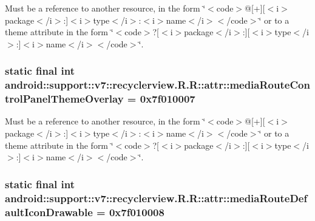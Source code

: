 Must be a reference to another resource, in the form \char`\"{}$<$code$>$@\mbox{[}+\mbox{]}\mbox{[}$<$i$>$package$<$/i$>$:\mbox{]}$<$i$>$type$<$/i$>$:$<$i$>$name$<$/i$>$$<$/code$>$\char`\"{} or to a theme attribute in the form \char`\"{}$<$code$>$?\mbox{[}$<$i$>$package$<$/i$>$:\mbox{]}\mbox{[}$<$i$>$type$<$/i$>$:\mbox{]}$<$i$>$name$<$/i$>$$<$/code$>$\char`\"{}. \hypertarget{classandroid_1_1support_1_1v7_1_1recyclerview_1_1_r_1_1attr_3626ffbedd7ef5a8436826ccac0b8109}{
\subsubsection[{mediaRouteControlPanelThemeOverlay}]{\setlength{\rightskip}{0pt plus 5cm}static final int android::support::v7::recyclerview.R.R::attr::mediaRouteControlPanelThemeOverlay = 0x7f010007}}
\label{classandroid_1_1support_1_1v7_1_1recyclerview_1_1_r_1_1attr_3626ffbedd7ef5a8436826ccac0b8109}


Must be a reference to another resource, in the form \char`\"{}$<$code$>$@\mbox{[}+\mbox{]}\mbox{[}$<$i$>$package$<$/i$>$:\mbox{]}$<$i$>$type$<$/i$>$:$<$i$>$name$<$/i$>$$<$/code$>$\char`\"{} or to a theme attribute in the form \char`\"{}$<$code$>$?\mbox{[}$<$i$>$package$<$/i$>$:\mbox{]}\mbox{[}$<$i$>$type$<$/i$>$:\mbox{]}$<$i$>$name$<$/i$>$$<$/code$>$\char`\"{}. \hypertarget{classandroid_1_1support_1_1v7_1_1recyclerview_1_1_r_1_1attr_b6b52f7a7de2fedfdace4f288ca179a8}{
\subsubsection[{mediaRouteDefaultIconDrawable}]{\setlength{\rightskip}{0pt plus 5cm}static final int android::support::v7::recyclerview.R.R::attr::mediaRouteDefaultIconDrawable = 0x7f010008}}
\label{classandroid_1_1support_1_1v7_1_1recyclerview_1_1_r_1_1attr_b6b52f7a7de2fedfdace4f288ca179a8}


